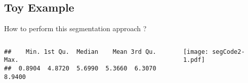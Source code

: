 \subsection*{ Toy Example}
   \begin{frame}[fragile]{How to perform this segmentation approach ?}
 
\begin{columns}
\begin{column}{0.4\textwidth}
\begin{knitrout}
\color{fgcolor}\begin{kframe}
\begin{alltt}
\hlstd{(}\hlstd{)}
\end{alltt}
\begin{verbatim}
##    Min. 1st Qu.  Median    Mean 3rd Qu.    Max. 
##  0.8904  4.8720  5.6990  5.3660  6.3070  8.9400
\end{verbatim}
\begin{alltt}
\end{alltt}
\end{kframe}
\end{knitrout}
\end{column}
\begin{column}{0.5\textwidth}
\texttt{[image: segCode2-1.pdf]}
\end{column}
\end{columns}
\end{frame}

